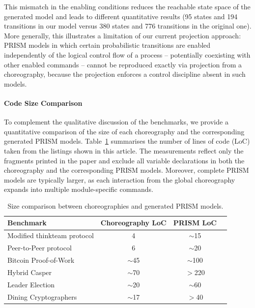 This mismatch in the enabling conditions reduces the reachable state space of the generated
model and leads to different quantitative results (95 states and 194 transitions in our model
versus 380 states and 776 transitions in the original one). More generally, this illustrates a
limitation of our current projection approach: PRISM models in which certain probabilistic
transitions are enabled independently of the logical control flow of a process -- potentially
coexisting with other enabled commands -- cannot be reproduced exactly via projection from
a choreography, because the projection enforces a control discipline absent in such models.



\paragraph{Code Size Comparison}

To complement the qualitative discussion of the benchmarks, we provide a quantitative
comparison of the size of each choreography and the corresponding generated PRISM
models. Table~\ref{tab:codesize} summarises the number of lines of code (LoC) taken
from the listings shown in this article. The measurements reflect only the fragments printed in the paper and exclude all variable declarations in both the choreography and the corresponding PRISM models. Moreover, complete PRISM models are typically larger, as each interaction from the global choreography expands into multiple module-specific commands.


\begin{table}[h]
\centering

\begin{tabular}{lccc}
\toprule
\textbf{Benchmark} & \textbf{Choreography LoC} & \textbf{PRISM LoC}  \\
\midrule
Modified thinkteam protocol & 4  & $\sim$15  \\
Peer-to-Peer protocol       & 6  & $\sim$20       \\
Bitcoin Proof-of-Work       & $\sim$45 & $\sim$100 \\
Hybrid Casper               & $\sim$70 & $>$220   \\
Leader Election             & $\sim$20 & $\sim$60 \\
Dining Cryptographers       & $\sim$17 & $>$40 \\
\bottomrule
\end{tabular}
\caption{Size comparison between choreographies and generated PRISM models.}
\label{tab:codesize}
\end{table}

